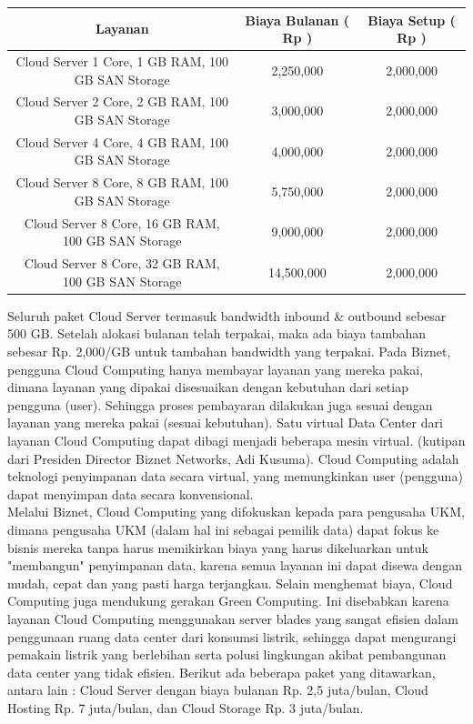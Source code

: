 \begin{table}
    \begin{tabular}{|c|c|c|}
        \hline
        Layanan                                            & Biaya Bulanan ( Rp ) & Biaya Setup ( Rp ) \\ \hline
        Cloud Server 1 Core, 1 GB RAM, 100 GB SAN Storage  & 2,250,000            & 2,000,000          \\ \hline
        Cloud Server 2 Core, 2 GB RAM, 100 GB SAN Storage  & 3,000,000            & 2,000,000          \\ \hline
        Cloud Server 4 Core, 4 GB RAM, 100 GB SAN Storage  & 4,000,000            & 2,000,000          \\ \hline
        Cloud Server 8 Core, 8 GB RAM, 100 GB SAN Storage  & 5,750,000            & 2,000,000          \\ \hline
        Cloud Server 8 Core, 16 GB RAM, 100 GB SAN Storage & 9,000,000            & 2,000,000          \\ \hline
        Cloud Server 8 Core, 32 GB RAM, 100 GB SAN Storage & 14,500,000           & 2,000,000          \\
        \hline
    \end{tabular}
\end{table}
\tab Seluruh paket Cloud Server termasuk bandwidth inbound \& outbound sebesar 500 GB. Setelah alokasi bulanan telah terpakai, maka ada biaya tambahan sebesar Rp. 2,000/GB untuk tambahan bandwidth yang terpakai. Pada Biznet, pengguna Cloud Computing hanya membayar layanan yang mereka pakai, dimana layanan yang dipakai disesuaikan dengan kebutuhan dari setiap pengguna (user). Sehingga proses pembayaran dilakukan juga sesuai dengan layanan yang mereka pakai (sesuai kebutuhan). Satu virtual Data Center dari layanan Cloud Computing dapat dibagi menjadi beberapa mesin virtual. (kutipan dari Presiden Director Biznet Networks, Adi Kusuma). Cloud Computing adalah teknologi penyimpanan data secara virtual, yang memungkinkan user (pengguna) dapat menyimpan data secara konvensional. \\Melalui Biznet, Cloud Computing yang difokuskan kepada para pengusaha UKM, dimana pengusaha UKM (dalam hal ini sebagai pemilik data) dapat fokus ke bisnis mereka tanpa harus memikirkan biaya yang harus dikeluarkan untuk "membangun" penyimpanan data, karena semua layanan ini dapat disewa dengan mudah, cepat dan yang pasti harga terjangkau. Selain menghemat biaya, Cloud Computing juga mendukung gerakan Green Computing. Ini disebabkan karena layanan Cloud Computing menggunakan server blades yang sangat efisien dalam penggunaan ruang data center dari konsumsi listrik, sehingga dapat mengurangi pemakain listrik yang berlebihan serta polusi lingkungan akibat pembangunan data center yang tidak efisien. Berikut ada beberapa paket yang ditawarkan, antara lain : Cloud Server dengan biaya bulanan Rp. 2,5 juta/bulan, Cloud Hosting Rp. 7 juta/bulan, dan Cloud Storage Rp. 3 juta/bulan.
